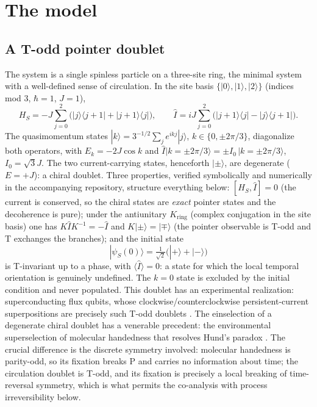 \documentclass[11pt]{article}
\newcommand{\Iop}{\hat{I}}
\begin{document}
\section{The model}\label{sec:model}

\subsection{A T-odd pointer doublet}

The system is a single spinless particle on a three-site ring, the minimal system with a well-defined sense of circulation. In the site basis $\{|0\rangle,|1\rangle,|2\rangle\}$ (indices mod 3, $\hbar=1$, $J=1$),
\begin{equation}
H_S = -J\sum_{j=0}^{2}\big(|j\rangle\langle j{+}1| + |j{+}1\rangle\langle j|\big),
\qquad
\Iop = iJ\sum_{j=0}^{2}\big(|j{+}1\rangle\langle j| - |j\rangle\langle j{+}1|\big).
\end{equation}
The quasimomentum states $|k\rangle = 3^{-1/2}\sum_j e^{ikj}|j\rangle$, $k\in\{0,\pm2\pi/3\}$, diagonalize both operators, with $E_k=-2J\cos k$ and $\Iop|k{=}{\pm}2\pi/3\rangle = \pm I_0\,|k{=}{\pm}2\pi/3\rangle$, $I_0=\sqrt3 J$. The two current-carrying states, henceforth $|\pm\rangle$, are degenerate ($E=+J$): a chiral doublet. Three properties, verified symbolically and numerically in the accompanying repository, structure everything below: $[H_S,\Iop]=0$ (the current is conserved, so the chiral states are \emph{exact} pointer states and the decoherence is pure); under the antiunitary $K_{\mathrm{ring}}$ (complex conjugation in the site basis) one has $K\Iop K^{-1}=-\Iop$ and $K|\pm\rangle=|\mp\rangle$ (the pointer observable is T-odd and T exchanges the branches); and the initial state
\begin{equation}
|\psi_S(0)\rangle = \tfrac{1}{\sqrt2}\big(|+\rangle+|-\rangle\big)
\end{equation}
is T-invariant up to a phase, with $\langle\Iop\rangle=0$: a state for which the local temporal orientation is genuinely undefined. The $k{=}0$ state is excluded by the initial condition and never populated. This doublet has an experimental realization: superconducting flux qubits, whose clockwise/counterclockwise persistent-current superpositions are precisely such T-odd doublets \cite{Friedman2000}. The einselection of a degenerate chiral doublet has a venerable precedent: the environmental superselection of molecular handedness that resolves Hund's paradox \cite{Harris1981,Trost2009}. The crucial difference is the discrete symmetry involved: molecular handedness is parity-odd, so its fixation breaks P and carries no information about time; the circulation doublet is T-odd, and its fixation is precisely a local breaking of time-reversal symmetry, which is what permits the co-analysis with process irreversibility below.
\end{document}
